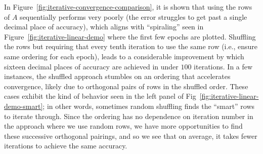 In Figure~\ref{fig:iterative-convergence-comparison}, it is shown that using the rows of $A$ sequentially performs very poorly (the error struggles to get past a single decimal place of accuracy), which aligns with ``spiraling'' seen in Figure~\ref{fig:iterative-linear-demo} where the first few epochs are plotted.
Shuffling the rows but requiring that every tenth iteration to use the same row (i.e., ensure same ordering for each epoch), leads to a considerable improvement by which sixteen decimal places of accuracy are achieved in under $100$ iterations.
In a few instances, the shuffled approach stumbles on an ordering that accelerates convergence, likely due to orthogonal pairs of rows in the shuffled order.
These cases exhibit the kind of behavior seen in the left panel of Fig~\ref{fig:iterative-linear-demo-smart}; in other words, sometimes random shuffling finds the ``smart'' rows to iterate through.
Since the ordering has no dependence on iteration number in the approach where we use random rows, we have more opportunities to find these successive orthogonal pairings, and so we see that on average, it takes fewer iterations to achieve the same accuracy.

%
%
%
